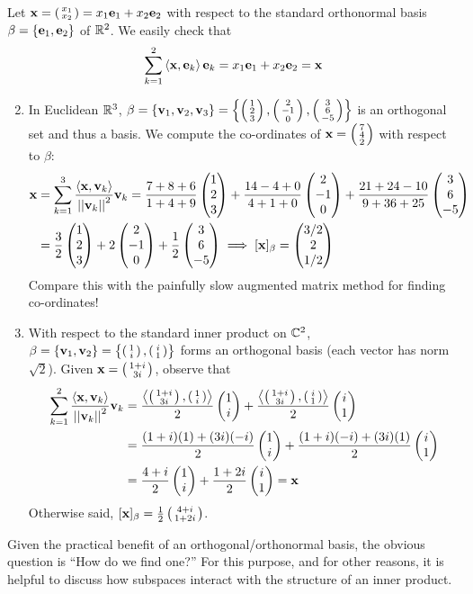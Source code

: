 \begin{examples}{}{}
	\exstart Let $\vx=\stwovec{x_1}{x_2} =x_1\ve_1+x_2\ve_2$ with respect to the standard orthonormal basis $\beta=\{\ve_1,\ve_2\}$ of $\R^2$. We easily check that
  \[
  	\sum_{k=1}^2\ip{\vx,\ve_k}\ve_k =x_1\ve_1+x_2\ve_2 =\vx
  \]
  \begin{enumerate}\setcounter{enumi}{1}
    \item In Euclidean $\R^3$, $\beta=\{\vv_1,\vv_2,\vv_3\}=\left\{\sthreevec 123,\sthreevec 2{-1}0,\sthreevec 36{-5}\right\}$ is an orthogonal set and thus a basis. We compute the co-ordinates of $\vx=\sthreevec 742$ with respect to $\beta$:\vspace{-3pt}
	\begin{align*}
		\vx
		&=\sum_{k=1}^3\frac{\ip{\vx,\vv_k}}{\Nm{\vv_k}^2}\vv_k 
			=\frac{7+8+6}{1+4+9}\threevec 123 
			+\frac{14-4+0}{4+1+0}\threevec 2{-1}0 
			+\frac{21+24-10}{9+36+25}\threevec 36{-5}\\
		&=\frac 32\threevec 123 + 2\threevec 2{-1}0 + \frac 12\threevec 36{-5} 
			\implies [\vx]_\beta=\threevec{3/2}{2}{1/2}
	\end{align*}
	Compare this with the painfully slow augmented matrix method for finding co-ordinates!
	
	\pagebreak[3]
	
    \item With respect to the standard inner product on $\C^2$, $\beta=\{\vv_1,\vv_2\} =\bigl\{\stwovec 1{i},\stwovec i1\bigr\}$ forms an orthogonal basis (each vector has norm $\sqrt 2$). Given $\vx=\stwovec{1+i}{3i}$, observe that
	  \begin{align*}
	  	\sum_{k=1}^2\frac{\ip{\vx,\vv_k}}{\Nm{\vv_k}^2}\vv_k
	  	&=\frac{\ip{\stwovec{1+i}{3i},\stwovec{1}{i}}}{2}\twovec{1}{i} 
	  	+
	  	\frac{\ip{\stwovec{1+i}{3i},\stwovec{i}{1}}}{2}\twovec{i}{1}\\
	  	&=\frac{(1+i)(1)+(3i)(-i)}{2}\twovec{1}{i} 
	  	+
	  	\frac{(1+i)(-i)+(3i)(1)}{2}\twovec{i}{1}\\
	  	&=\frac{4+i}{2}\twovec{1}{i}
	  	+\frac{1+2i}2\twovec{i}{1} =\vx	 
	  \end{align*}
	  Otherwise said, $[\vx]_\beta=\frac 12\stwovec{4+i}{1+2i}$.
  \end{enumerate}
\end{examples}



Given the practical benefit of an orthogonal/orthonormal basis, the obvious question is ``How do we find one?'' For this purpose, and for other reasons, it is helpful to discuss how subspaces interact with the structure of an inner product. 

